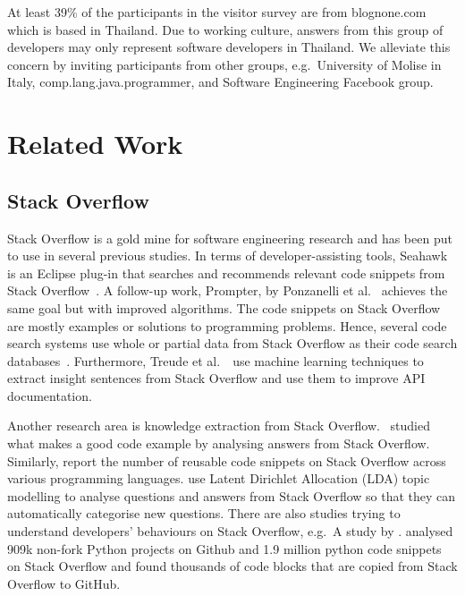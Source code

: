 \documentclass{svjour3}                     %
\begin{document}
At least 39\% of the participants in the visitor survey are from
\textsf{blognone.com} which is based in Thailand. Due to working culture,
answers from this group of developers may only represent software developers in
Thailand. We alleviate this concern by inviting participants from other groups,
e.g.~University of Molise in Italy, comp.lang.java.programmer, and Software
Engineering Facebook group.

\section{Related Work}

\subsection{Stack Overflow}

Stack Overflow is a gold mine for software engineering research and has been put
to use in several previous studies. In terms of developer-assisting tools,
Seahawk is an Eclipse plug-in that searches and recommends relevant code
snippets from Stack Overflow~\citep{Ponzanelli2013}. A follow-up work, Prompter,
by Ponzanelli et al.~\citep{Ponzanelli2014} achieves the same goal but with
improved algorithms. The code snippets on Stack Overflow are mostly examples or
solutions to programming problems. Hence, several code search systems use whole
or partial data from Stack Overflow as their code search
databases~\citep{Keivanloo2014,Park2014,
	Stolee2014,Subramanian2013,Diamantopoulos2015}. Furthermore, Treude et
al.~\cite{Treude2016}~use machine learning techniques to extract insight
sentences from Stack Overflow and use them to improve API documentation.

Another research area is knowledge extraction from Stack Overflow.
\cite{Nasehi2012}~studied what makes a good code example by analysing answers
from Stack Overflow. Similarly, \cite{Yang2016} report the number of reusable
code snippets on Stack Overflow across various programming languages.
\cite{Wang2013_StackOverflow} use Latent Dirichlet Allocation (LDA) topic
modelling to analyse questions and answers from Stack Overflow so that they can
automatically categorise new questions. There are also studies trying to
understand developers' behaviours on Stack Overflow, e.g.~A study by
\cite{Movshovitz-Attias2013,Rosen2016,Choetkiertikul2015,Bosu2013}.
\cite{Yang2017} analysed 909k non-fork Python projects on Github and 1.9 million
python code snippets on Stack Overflow and found thousands of code blocks that
are copied from Stack Overflow to GitHub.
\end{document}
